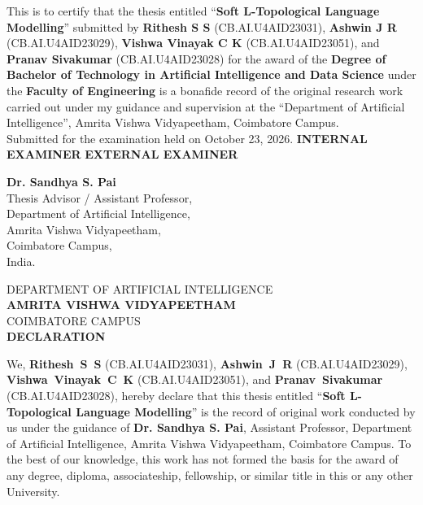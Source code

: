 \documentclass[a4paper, 12pt]{report}
\theoremstyle{definition}
\begin{document}
	\vspace*{.5cm}
	\noindent This is to certify that the thesis entitled \enquote{\textbf{Soft L-Topological Language Modelling}} submitted by \textbf{Rithesh S S} (CB.AI.U4AID23031), \textbf{Ashwin J R} (CB.AI.U4AID23029), \textbf{Vishwa Vinayak C K} (CB.AI.U4AID23051), and \textbf{Pranav Sivakumar} (CB.AI.U4AID23028) for the award of the \textbf{Degree of Bachelor of Technology in Artificial Intelligence and Data Science} under the \textbf{Faculty of Engineering} is a bonafide record of the original research work carried out under my guidance and supervision at the \enquote{Department of Artificial Intelligence}, Amrita Vishwa Vidyapeetham, Coimbatore Campus.\\
    \vfill
    Submitted for the examination held on October 23, 2026.
    \vfill
    \textbf{INTERNAL EXAMINER} \hfill \textbf{EXTERNAL EXAMINER}
    \vfill
    \begin{center}
		\textbf{Dr. Sandhya S. Pai}\\
		Thesis Advisor / Assistant Professor,\\
		Department of Artificial Intelligence,\\
		Amrita Vishwa Vidyapeetham,\\
		Coimbatore Campus,\\
		India.
    \end{center}

	\newpage
	\begin{center}
		{\large DEPARTMENT OF ARTIFICIAL INTELLIGENCE}\\
		\Large{ \textbf{AMRITA VISHWA VIDYAPEETHAM}}\\
		{\large COIMBATORE CAMPUS}\\
		\vspace*{1.5cm}
		\large {\textbf{DECLARATION}}
		\vspace*{.3cm}
	\end{center}
	
	{\sloppy
	\noindent We, \textbf{Rithesh~S~S} (CB.AI.U4AID23031), \textbf{Ashwin~J~R} (CB.AI.U4AID23029), \textbf{Vishwa~Vinayak~C~K} (CB.AI.U4AID23051), and \textbf{Pranav~Sivakumar} (CB.AI.U4AID23028), hereby declare that this thesis entitled \enquote{\textbf{Soft L-Topological Language Modelling}} is the record of original work conducted by us under the guidance of \textbf{Dr. Sandhya S. Pai}, Assistant Professor, Department of Artificial Intelligence, Amrita Vishwa Vidyapeetham, Coimbatore Campus. To the best of our knowledge, this work has not formed the basis for the award of any degree, diploma, associateship, fellowship, or similar title in this or any other University.\par}
	
\end{document}

